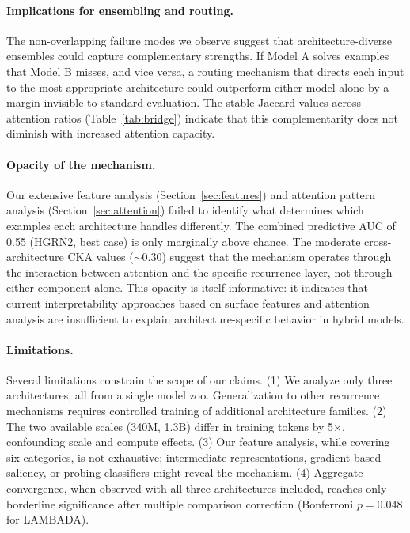 \documentclass[11pt]{article}
\begin{document}
\paragraph{Implications for ensembling and routing.}
The non-overlapping failure modes we observe suggest that architecture-diverse ensembles could capture complementary strengths. If Model A solves examples that Model B misses, and vice versa, a routing mechanism that directs each input to the most appropriate architecture could outperform either model alone by a margin invisible to standard evaluation. The stable Jaccard values across attention ratios (Table~\ref{tab:bridge}) indicate that this complementarity does not diminish with increased attention capacity.

\paragraph{Opacity of the mechanism.}
Our extensive feature analysis (Section~\ref{sec:features}) and attention pattern analysis (Section~\ref{sec:attention}) failed to identify what determines which examples each architecture handles differently. The combined predictive AUC of 0.55 (HGRN2, best case) is only marginally above chance. The moderate cross-architecture CKA values ($\sim$0.30) suggest that the mechanism operates through the interaction between attention and the specific recurrence layer, not through either component alone. This opacity is itself informative: it indicates that current interpretability approaches based on surface features and attention analysis are insufficient to explain architecture-specific behavior in hybrid models.

\paragraph{Limitations.}
Several limitations constrain the scope of our claims. (1) We analyze only three architectures, all from a single model zoo. Generalization to other recurrence mechanisms requires controlled training of additional architecture families. (2) The two available scales (340M, 1.3B) differ in training tokens by 5$\times$, confounding scale and compute effects. (3) Our feature analysis, while covering six categories, is not exhaustive; intermediate representations, gradient-based saliency, or probing classifiers might reveal the mechanism. (4) Aggregate convergence, when observed with all three architectures included, reaches only borderline significance after multiple comparison correction (Bonferroni $p = 0.048$ for LAMBADA).
\end{document}
